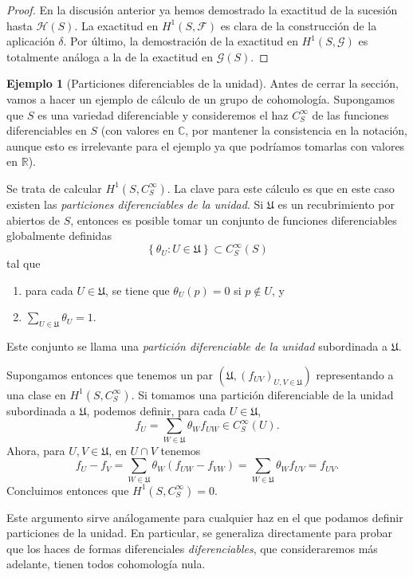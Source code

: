 \documentclass[autocontact]{gaceta}
\theoremstyle{definition} \newtheorem{defn}[thm]{Definición}
\theoremstyle{definition} \newtheorem{ejemplo}[thm]{Ejemplo}
\theoremstyle{definition} \newtheorem{ejercicio}[thm]{Ejercicio}
\def\CC{\mathbb{C}}
\def\RR{\mathbb{R}}
\def\FF{\mathscr{F}}
\def\GG{\mathscr{G}}
\def\HH{\mathscr{H}}
\def\UU{\mathfrak{U}}
\begin{document}
\begin{proof}
  En la discusión anterior ya hemos demostrado la exactitud de la sucesión hasta $\HH(S)$. La exactitud en $H^1(S,\FF)$ es clara de la construcción de la aplicación $\delta$. Por último, la demostración de la exactitud en $H^1(S,\GG)$ es totalmente análoga a la de la exactitud en $\GG(S)$.
\end{proof}

\begin{ejemplo}[Particiones diferenciables de la unidad]
  Antes de cerrar la sección, vamos a hacer un ejemplo de cálculo de un grupo de cohomología. Supongamos que $S$ es una variedad diferenciable y consideremos el haz $C^\infty_S$ de las funciones diferenciables en $S$ (con valores en $\CC$, por mantener la consistencia en la notación, aunque esto es irrelevante para el ejemplo ya que podríamos tomarlas con valores en $\RR$).
  
  Se trata de calcular $H^1(S,C^\infty_S)$. La clave para este cálculo es que en este caso existen las \emph{particiones diferenciables de la unidad}. Si $\mathfrak{U}$ es un recubrimiento por abiertos de $S$, entonces es posible tomar un conjunto de funciones diferenciables globalmente definidas $$\left\{ \theta_U : U \in \mathfrak{U} \right\}  \subset C^{\infty}_S(S)$$
  tal que
  \begin{enumerate}
    \item para cada $U\in \mathfrak{U}$, se tiene que $\theta_U(p)=0$ si $p\not \in U$, y
    \item $\sum_{U\in \mathfrak{U}} \theta_U = 1$.
  \end{enumerate}
  Este conjunto se llama una \emph{partición diferenciable de la unidad} subordinada a $\UU$.

  Supongamos entonces que tenemos un par $(\mathfrak{U},(f_{UV})_{U,V\in \UU})$ representando a una clase en $H^1(S,C^\infty_S)$. Si tomamos una partición diferenciable de la unidad subordinada a $\UU$, podemos definir, para cada $U\in \UU$,
  \begin{equation*}
    f_U = \sum_{W\in \UU} \theta_W f_{UW} \in C^\infty_S(U).
  \end{equation*}
  Ahora, para $U,V \in \UU$, en $U\cap V$ tenemos
  \begin{equation*}
    f_U - f_V = \sum_{W\in \UU} \theta_W (f_{UW} - f_{VW}) = \sum_{W\in \UU} \theta_W f_{UV} = f_{UV}.
  \end{equation*}
  Concluimos entonces que $H^1(S,C^\infty_S)=0$.

  Este argumento sirve análogamente para cualquier haz en el que podamos definir particiones de la unidad. En particular, se generaliza directamente para probar que los haces de formas diferenciales \emph{diferenciables}, que consideraremos más adelante, tienen todos cohomología nula. 
  

\end{ejemplo}
\end{document}
